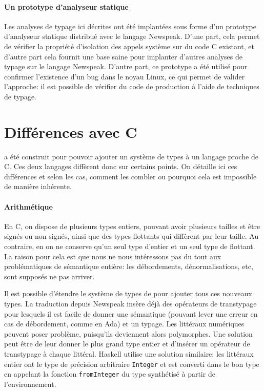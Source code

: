 \paragraph{Un prototype d'analyseur statique}

Les analyses de typage ici décrites ont été implantées sous forme d'un prototype
d'analyseur statique distribué avec le langage Newspeak.
D'une part, cela permet de vérifier la propriété d'isolation des appels système
sur du code C existant, et d'autre part cela fournit une base saine pour
implanter d'autres analyses de typage sur le langage Newspeak.
D'autre part, ce prototype a été utilisé pour confirmer l'existence d'un bug
dans le noyau Linux, ce qui permet de valider l'approche: il est possible de
vérifier du code de production à l'aide de techniques de typage.

\section{Différences avec C}

\langname a été construit pour pouvoir ajouter un système de types à un langage
proche de C. Ces deux langages diffèrent donc sur certains points. On détaille
ici ces différences et selon les cas, comment les combler ou pourquoi cela est
impossible de manière inhérente.

\paragraph{Arithmétique}

En C, on dispose de plusieurs types entiers, pouvant avoir plusieurs tailles et
être signés ou non signés, ainsi que des types flottants qui diffèrent par leur
taille. Au contraire, en \langname{} on ne conserve qu'un seul type d'entier et
un seul type de flottant. La raison pour cela est que nous ne nous intéressons
pas du tout aux problématiques de sémantique entière: les débordements,
dénormalisations, etc, sont supposés ne pas arriver.

Il est possible d'étendre le système de types de \langname{} pour ajouter tous
ces nouveaux types. La traduction depuis Newspeak insère déjà des opérateurs de
transtypage pour lesquels il est facile de donner une sémantique (pouvant lever
une erreur en cas de débordement, comme en Ada) et un typage. Les littéraux
numériques peuvent poser problème, puisqu'ils deviennent alors polymorphes. Une
solution peut être de leur donner le plus grand type entier et d'insérer un
opérateur de transtypage à chaque littéral. Haskell utilise une solution
similaire: les littéraux entier ont le type de précision arbitraire
\texttt{Integer} et est converti dans le bon type en appelant la fonction
\texttt{fromInteger} du type synthétisé à partir de l'environnement.

